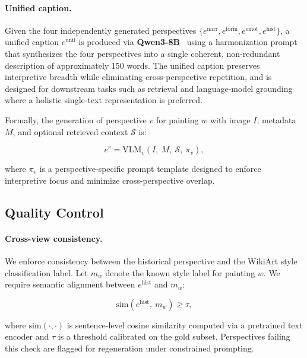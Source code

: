 \paragraph{Unified caption.}
Given the four independently generated perspectives $\{e^{\text{narr}}, e^{\text{form}}, e^{\text{emot}}, e^{\text{hist}}\}$, a unified caption $e^{\text{unif}}$ is produced via \textbf{Qwen3-8B}~\cite{qwen3} using a harmonization prompt that synthesizes the four perspectives into a single coherent, non-redundant description of approximately 150 words.
The unified caption preserves interpretive breadth while eliminating cross-perspective repetition, and is designed for downstream tasks such as retrieval and language-model grounding where a holistic single-text representation is preferred.

Formally, the generation of perspective $v$ for painting $w$ with image $I$, metadata $M$, and optional retrieved context $\mathcal{S}$ is:

\begin{equation}
e^{v} = \text{VLM}_v\!\left(I,\ M,\ \mathcal{S},\ \pi_v\right),
\end{equation}

where $\pi_v$ is a perspective-specific prompt template designed to enforce interpretive focus and minimize cross-perspective overlap.

\subsection{Quality Control}

\paragraph{Cross-view consistency.}
We enforce consistency between the historical perspective and the WikiArt style classification label.
Let $m_w$ denote the known style label for painting $w$.
We require semantic alignment between $e^{\text{hist}}$ and $m_w$:

\begin{equation}
\text{sim}\!\left(e^{\text{hist}},\ m_w\right) \ge \tau,
\end{equation}

where $\text{sim}(\cdot, \cdot)$ is sentence-level cosine similarity computed via a pretrained text encoder and $\tau$ is a threshold calibrated on the gold subset.
Perspectives failing this check are flagged for regeneration under constrained prompting.

